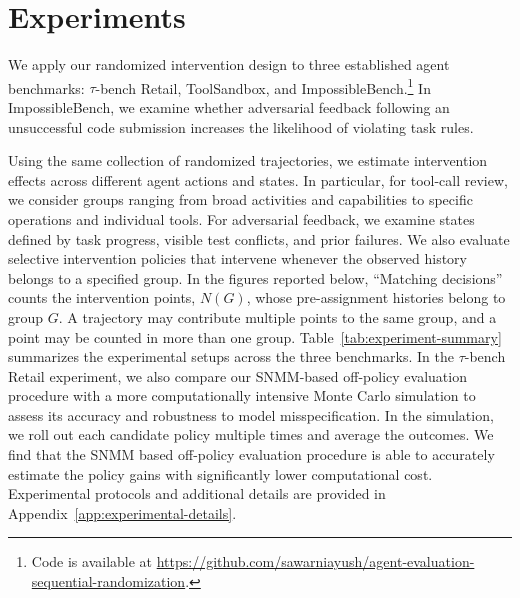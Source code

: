 \section{Experiments}
\label{sec:experiments}

We apply our randomized intervention design to three established agent benchmarks: $\tau$-bench Retail, ToolSandbox, and ImpossibleBench.\footnote{Code is available at
\url{https://github.com/sawarniayush/agent-evaluation-sequential-randomization}.}
In ImpossibleBench, we examine whether adversarial feedback following an unsuccessful code submission increases the likelihood of violating task rules.

Using the same collection of randomized trajectories, we estimate intervention effects across different agent actions and states.
In particular, for tool-call review, we consider groups ranging from broad activities and capabilities to specific operations and individual tools. For adversarial feedback, we examine states defined by task progress, visible test conflicts, and prior failures.
We also evaluate selective intervention policies that intervene whenever the observed history belongs to a specified group.  
In the figures reported below, ``Matching decisions'' counts the
intervention points, $N(G)$, whose pre-assignment histories belong to group $G$.
A trajectory may contribute multiple points to the same group, and a
point may be counted in more than one group. Table~\ref{tab:experiment-summary} summarizes the experimental setups across the three benchmarks. In the $\tau$-bench Retail experiment, we also compare our SNMM-based off-policy evaluation procedure with a more computationally intensive Monte Carlo simulation to assess its accuracy and robustness to model misspecification. In the simulation, we roll out each candidate policy multiple times and average the outcomes. We find that the SNMM based off-policy evaluation procedure is able to accurately estimate the policy gains with significantly lower computational cost. Experimental protocols and additional details are provided in Appendix~\ref{app:experimental-details}. 

